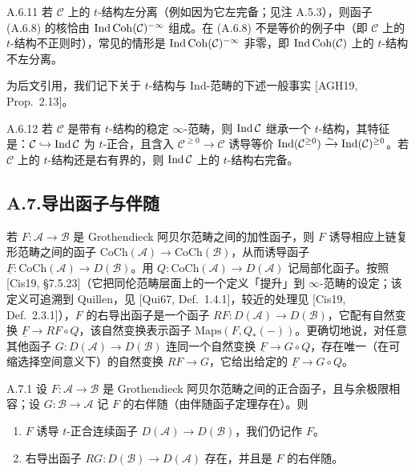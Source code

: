 \begin{rem}{A.6.11}\label{rem:a4-17-A-6-11}
若 $\mathcal C$ 上的 $t$-结构左分离（例如因为它左完备；见注 A.5.3），则函子 (A.6.8) 的核恰由 $\operatorname{Ind}\operatorname{Coh}(\mathcal C)^{-\infty}$ 组成。在 (A.6.8) 不是等价的例子中（即 $\mathcal C$ 上的 $t$-结构不正则时），常见的情形是 $\operatorname{Ind}\operatorname{Coh}(\mathcal C)^{-\infty}$ 非零，即 $\operatorname{Ind}\operatorname{Coh}(\mathcal C)$ 上的 $t$-结构不左分离。
\end{rem}

为后文引用，我们记下关于 $t$-结构与 Ind-范畴的下述一般事实 [AGH19, Prop.~2.13]。

\begin{prop}{A.6.12}\label{prop:a4-17-A-6-12}
若 $\mathcal C$ 是带有 $t$-结构的稳定 $\infty$-范畴，则 $\operatorname{Ind}\mathcal C$ 继承一个 $t$-结构，其特征是：$\mathcal C\hookrightarrow\operatorname{Ind}\mathcal C$ 为 $t$-正合，且含入 $\mathcal C^{\geq0}\to\mathcal C$ 诱导等价 $\operatorname{Ind}(\mathcal C^{\geq0})\xrightarrow{\sim}\operatorname{Ind}(\mathcal C)^{\geq0}$。若 $\mathcal C$ 上的 $t$-结构还是右有界的，则 $\operatorname{Ind}\mathcal C$ 上的 $t$-结构右完备。
\end{prop}

\subsection*{A.7.\quad 导出函子与伴随}

若 $F:\mathcal A\to\mathcal B$ 是 Grothendieck 阿贝尔范畴之间的加性函子，则 $F$ 诱导相应上链复形范畴之间的函子 $\mathrm{CoCh}(\mathcal A)\to\mathrm{CoCh}(\mathcal B)$，从而诱导函子 $\underline F:\mathrm{CoCh}(\mathcal A)\to D(\mathcal B)$。用 $Q:\mathrm{CoCh}(\mathcal A)\to D(\mathcal A)$ 记局部化函子。按照 [Cis19, §7.5.23]（它把同伦范畴层面上的一个定义「提升」到 $\infty$-范畴的设定；该定义可追溯到 Quillen，见 [Qui67, Def.~1.4.1]，较近的处理见 [Cis19, Def.~2.3.1]），$F$ 的右导出函子是一个函子 $RF:D(\mathcal A)\to D(\mathcal B)$，它配有自然变换 $\underline F\to RF\circ Q$，该自然变换表示函子 $\mathrm{Maps}(F,Q_*(-))$。更确切地说，对任意其他函子 $G:D(\mathcal A)\to D(\mathcal B)$ 连同一个自然变换 $\underline F\to G\circ Q$，存在唯一（在可缩选择空间意义下）的自然变换 $RF\to G$，它给出给定的 $\underline F\to G\circ Q$。

\begin{prop}{A.7.1}\label{prop:a4-17-A-7-1}
设 $F:\mathcal A\to\mathcal B$ 是 Grothendieck 阿贝尔范畴之间的正合函子，且与余极限相容；设 $G:\mathcal B\to\mathcal A$ 记 $F$ 的右伴随（由伴随函子定理存在）。则
\begin{enumerate}[label=(\arabic*)]
\item $F$ 诱导 $t$-正合连续函子 $D(\mathcal A)\to D(\mathcal B)$，我们仍记作 $F$。
\item 右导出函子 $RG:D(\mathcal B)\to D(\mathcal A)$ 存在，并且是 $F$ 的右伴随。
\end{enumerate}
\end{prop}

